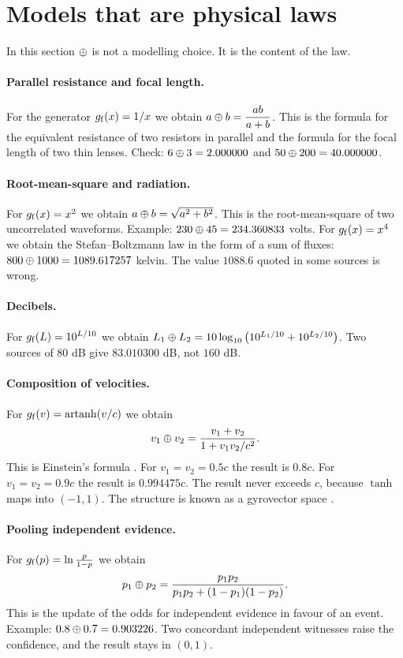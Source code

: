 \documentclass[11pt,a4paper]{article}
\begin{document}
\section{Models that are physical laws}

In this section $\mathbin{\oplus}$ is not a modelling choice. It is the content of the law.

\paragraph{Parallel resistance and focal length.}
For the generator $g_{\mathrm{f}}(x)=1/x$ we obtain $a\mathbin{\oplus} b=\dfrac{ab}{a+b}$. This is the
formula for the equivalent resistance of two resistors in parallel and the
formula for the focal length of two thin lenses. Check: $6\mathbin{\oplus}3=2.000000$ and
$50\mathbin{\oplus}200=40.000000$.

\paragraph{Root-mean-square and radiation.}
For $g_{\mathrm{f}}(x)=x^{2}$ we obtain $a\mathbin{\oplus} b=\sqrt{a^{2}+b^{2}}$. This is the
root-mean-square of two uncorrelated waveforms. Example: $230\mathbin{\oplus}45=234.360833$
volts. For $g_{\mathrm{f}}(x)=x^{4}$ we obtain the Stefan--Boltzmann law in the form of a
sum of fluxes: $800\mathbin{\oplus}1000=1089.617257$ kelvin. The value $1088.6$ quoted in
some sources is wrong.

\paragraph{Decibels.}
For $g_{\mathrm{f}}(L)=10^{L/10}$ we obtain
$L_{1}\mathbin{\oplus} L_{2}=10\log_{10}\big(10^{L_{1}/10}+10^{L_{2}/10}\big)$.
Two sources of $80$ dB give $83.010300$ dB, not $160$ dB.

\paragraph{Composition of velocities.}
For $g_{\mathrm{f}}(v)=\operatorname{artanh}(v/c)$ we obtain
\[
v_{1}\mathbin{\oplus} v_{2}=\frac{v_{1}+v_{2}}{1+v_{1}v_{2}/c^{2}}.
\]
This is Einstein's formula \cite{einstein1905}. For $v_{1}=v_{2}=0.5c$ the result
is $0.8c$. For $v_{1}=v_{2}=0.9c$ the result is $0.994475c$. The result never
exceeds $c$, because $\tanh$ maps into $(-1,1)$. The structure is known as a
gyrovector space \cite{ungar2008}.

\paragraph{Pooling independent evidence.}
For $g_{\mathrm{f}}(p)=\ln\frac{p}{1-p}$ we obtain
\[
p_{1}\mathbin{\oplus} p_{2}=\frac{p_{1}p_{2}}{p_{1}p_{2}+(1-p_{1})(1-p_{2})}.
\]
This is the update of the odds for independent evidence in favour of an event.
Example: $0.8\mathbin{\oplus}0.7=0.903226$. Two concordant independent witnesses raise the
confidence, and the result stays in $(0,1)$.
\end{document}
